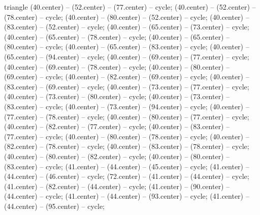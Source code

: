 \begin{pgfonlayer}{triangle}
 (40.center) -- (52.center) -- (77.center) -- cycle; 
 (40.center) -- (52.center) -- (78.center) -- cycle; 
 (40.center) -- (80.center) -- (52.center) -- cycle; 
 (40.center) -- (83.center) -- (52.center) -- cycle; 
 (40.center) -- (65.center) -- (73.center) -- cycle; 
 (40.center) -- (65.center) -- (78.center) -- cycle; 
 (40.center) -- (65.center) -- (80.center) -- cycle; 
 (40.center) -- (65.center) -- (83.center) -- cycle; 
 (40.center) -- (65.center) -- (94.center) -- cycle; 
 (40.center) -- (69.center) -- (77.center) -- cycle; 
 (40.center) -- (69.center) -- (78.center) -- cycle; 
 (40.center) -- (80.center) -- (69.center) -- cycle; 
 (40.center) -- (82.center) -- (69.center) -- cycle; 
 (40.center) -- (83.center) -- (69.center) -- cycle; 
 (40.center) -- (73.center) -- (77.center) -- cycle; 
 (40.center) -- (73.center) -- (80.center) -- cycle; 
 (40.center) -- (73.center) -- (83.center) -- cycle; 
 (40.center) -- (73.center) -- (94.center) -- cycle; 
 (40.center) -- (77.center) -- (78.center) -- cycle; 
 (40.center) -- (80.center) -- (77.center) -- cycle; 
 (40.center) -- (82.center) -- (77.center) -- cycle; 
 (40.center) -- (83.center) -- (77.center) -- cycle; 
 (40.center) -- (80.center) -- (78.center) -- cycle; 
 (40.center) -- (82.center) -- (78.center) -- cycle; 
 (40.center) -- (83.center) -- (78.center) -- cycle; 
 (40.center) -- (80.center) -- (82.center) -- cycle; 
 (40.center) -- (80.center) -- (83.center) -- cycle; 
 (41.center) -- (44.center) -- (45.center) -- cycle; 
 (41.center) -- (44.center) -- (46.center) -- cycle; 
 (72.center) -- (41.center) -- (44.center) -- cycle; 
 (41.center) -- (82.center) -- (44.center) -- cycle; 
 (41.center) -- (90.center) -- (44.center) -- cycle; 
 (41.center) -- (44.center) -- (93.center) -- cycle; 
 (41.center) -- (44.center) -- (95.center) -- cycle; 

\end{pgfonlayer}
